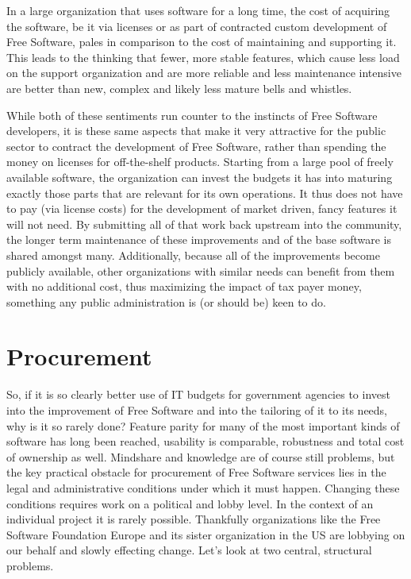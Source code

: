 In a large organization that uses software for a long time, the cost of acquiring
the software, be it via licenses or as part of contracted custom development of
Free Software, pales in comparison to the cost of maintaining and supporting it.
This leads to the thinking that fewer, more stable features, which cause less load
on the support organization and are more reliable and less maintenance intensive
are better than new, complex and likely less mature bells and whistles.

While both of these sentiments run counter to the instincts of Free Software
developers, it is these same aspects that make it very attractive for the
public sector to contract the development of Free Software, rather than
spending the money on licenses for off-the-shelf products. Starting from a
large pool of freely available software, the organization can invest the
budgets it has into maturing exactly those parts that are relevant for its own
operations. It thus does not have to pay (via license costs) for the development of
market driven, fancy features it will not need. By submitting all of that work
back upstream into the community, the longer term maintenance of these
improvements and of the base software is shared amongst many. Additionally,
because all of the improvements become publicly available, other
organizations with similar needs can benefit from them with no
additional cost, thus maximizing the impact of tax payer money,
something any public administration is (or should be) keen to do.

\section*{Procurement}

So, if it is so clearly better use of IT budgets for government agencies to invest
into the improvement of Free Software and into the tailoring of it to its needs, why is it
so rarely done? Feature parity for many of the most important kinds of software has
long been reached, usability is comparable, robustness and total cost of ownership
as well. Mindshare and knowledge are of course still problems, but the key practical obstacle
for procurement of Free Software services lies in the legal and administrative
conditions under which it must happen. Changing these conditions requires work
on a political and lobby level. In the context of an individual project it is
rarely possible. Thankfully organizations like the Free Software Foundation Europe and
its sister organization in the US are lobbying on our behalf and slowly effecting
change. Let's look at two central, structural problems.

